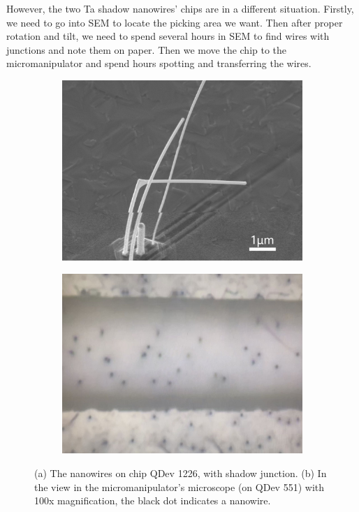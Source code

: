 However, the two Ta shadow nanowires' chips are in a different situation. Firstly, we need to go into SEM to locate the picking area we want. Then after proper rotation and tilt, we need to spend several hours in SEM to find wires with junctions and note them on paper. Then we move the chip to the micromanipulator and spend hours spotting and transferring the wires.
\begin{figure}[h!]
    \centering
    \begin{subfigure}[b]{0.48\textwidth}
         \centering
         \includegraphics[width=\textwidth]{Pic/TaNWonChip.jpg}
         \caption{}
         \label{TaNWonchip}
     \end{subfigure}
     \hfill
     \begin{subfigure}[b]{0.48\textwidth}
         \centering
         \includegraphics[width=\textwidth]{Pic/TaNWonChip2.jpg}
         \caption{}
         \label{fig:three sin x}
     \end{subfigure}
    \caption{(a) The nanowires on chip QDev 1226, with shadow junction. (b) In the view in the micromanipulator's microscope (on QDev 551) with 100x magnification, the black dot indicates a nanowire.}
    \label{TaNWonchip2}
\end{figure}

